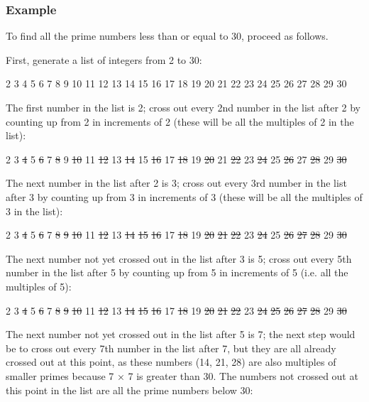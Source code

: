 \documentclass[a4paper, 12pt]{article}
\begin{document}
\subsubsection*{Example}

To find all the prime numbers less than or equal to 30, proceed as follows.

First, generate a list of integers from 2 to 30:

\begin{center}
  2  3  4  5  6  7  8  9  10 11 12 13 14 15 16 17 18 19 20 21 22 23 24 25 26 27 28 29 30
\end{center}

The first number in the list is 2; cross out every 2nd number in the list after 2 by counting up from 2 in increments of 2 (these will be all the multiples of 2 in the list):

\begin{center}
  2  3  \sout{4}  5  \sout{6}  7  \sout{8}  9  \sout{10} 11 \sout{12} 13 \sout{14} 15 \sout{16} 17 \sout{18} 19 \sout{20} 21 \sout{22} 23 \sout{24} 25 \sout{26} 27 \sout{28} 29 \sout{30}
\end{center}

The next number in the list after 2 is 3; cross out every 3rd number in the list after 3 by counting up from 3 in increments of 3 (these will be all the multiples of 3 in the list):

\begin{center}
  2  3  \sout{4}  5  \sout{6}  7  \sout{8}  \sout{9}  \sout{10} 11 \sout{12} 13 \sout{14} \sout{15} \sout{16} 17 \sout{18} 19 \sout{20} \sout{21} \sout{22} 23 \sout{24} 25 \sout{26} \sout{27} \sout{28} 29 \sout{30}
\end{center}

The next number not yet crossed out in the list after 3 is 5; cross out every 5th number in the list after 5 by counting up from 5 in increments of 5 (i.e. all the multiples of 5):

\begin{center}
  2  3  \sout{4}  5  \sout{6}  7  \sout{8}  \sout{9}  \sout{10} 11 \sout{12} 13 \sout{14} \sout{15} \sout{16} 17 \sout{18} 19 \sout{20} \sout{21} \sout{22} 23 \sout{24} \sout{25} \sout{26} \sout{27} \sout{28} 29 \sout{30}
\end{center}

The next number not yet crossed out in the list after 5 is 7; the next step would be to cross out every 7th number in the list after 7, but they are all already crossed out at this point, as these numbers (14, 21, 28) are also multiples of smaller primes because 7 × 7 is greater than 30. The numbers not crossed out at this point in the list are all the prime numbers below 30:
\end{document}
